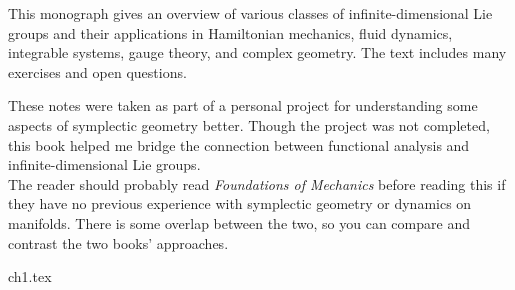 \documentclass{../booknotes}
\begin{document}
\maketitle

\begin{pubdescrip}
	\indent This monograph gives an overview of various classes of infinite-dimensional Lie groups and their applications in Hamiltonian mechanics, fluid dynamics, integrable systems, gauge theory, and complex geometry. The text includes many exercises and open questions.
\end{pubdescrip}

\begin{transcribernote}
	\indent These notes were taken as part of a personal project for understanding some aspects of symplectic geometry better. Though the project was not completed, this book helped me bridge the connection between functional analysis and infinite-dimensional Lie groups. \\
	\indent The reader should probably read \textit{Foundations of Mechanics} before reading this if they have no previous experience with symplectic geometry or dynamics on manifolds. There is some overlap between the two, so you can compare and contrast the two books' approaches.
\end{transcribernote}

\tableofcontents

{ch1.tex}
\end{document}
